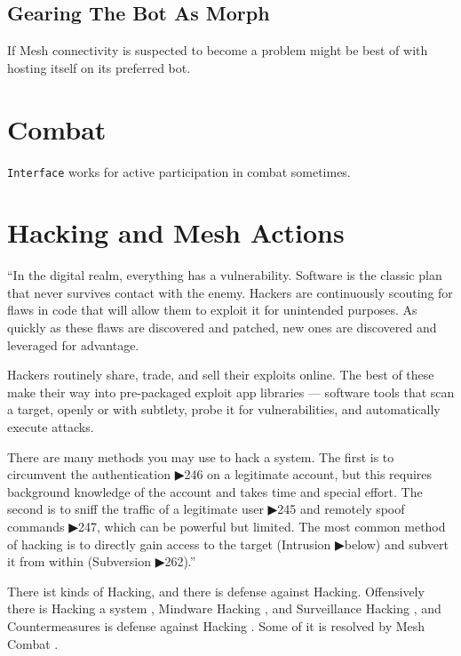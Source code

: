 \subsection{Gearing The Bot As Morph}

If \gls{Mesh} connectivity is suspected to become a problem \texttt{\egr{}}\index{\egr{}} might be best of with hosting itself on its preferred bot.


\section{Combat}

\texttt{Interface} works for active participation in combat sometimes.  \citep[p. 50]{ep2e_1.1_2019}


\section{Hacking and Mesh Actions}

“In the digital realm, everything has a vulnerability. Software is the classic plan that never survives contact with the enemy. Hackers are continuously scouting for flaws in code that will allow them to exploit it for unintended purposes. As quickly as these flaws are discovered and patched, new ones are discovered and leveraged for advantage.

Hackers routinely share, trade, and sell their exploits online. The best of these make their way into pre-packaged exploit app libraries — software tools that scan a target, openly or with subtlety, probe it for vulnerabilities, and automatically execute attacks. 

There are many methods you may use to hack a system. The first is to circumvent the authentication ▶246 on a legitimate account, but this requires background knowledge of the account and takes time and special effort. The second is to sniff the traffic of a legitimate user ▶245 and remotely spoof commands ▶247, which can be powerful but limited. The most common method of hacking is to directly gain access to the target (Intrusion ▶below) and subvert it from within (Subversion ▶262).” \citep[pg. 258]{ep2e_1.1_2019}

There ist kinds of Hacking, and there is defense against Hacking. Offensively there is Hacking a system \citep[pg. 258]{ep2e_1.1_2019}, Mindware Hacking \citep[pg. 266]{ep2e_1.1_2019}, and Surveillance Hacking \citep[pg. 270]{ep2e_1.1_2019}, and Countermeasures is defense against Hacking \citep[pg. 260]{ep2e_1.1_2019}. Some of it is resolved by Mesh Combat \citep[pg. 264]{ep2e_1.1_2019}.


